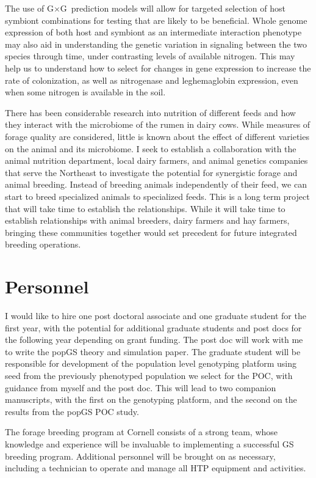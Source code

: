 \documentclass[10pt]{article}
\newcommand{\gxg}{G$\times$G}
\begin{document}
The use of \gxg\ prediction models will allow for targeted selection of host symbiont combinations for testing that are likely to be beneficial. Whole genome expression of both host and symbiont as an intermediate interaction phenotype may also aid in understanding the genetic variation in signaling between the two species through time, under contrasting levels of available nitrogen. This may help us to understand how to select for changes in gene expression to increase the rate of colonization, as well as nitrogenase and leghemaglobin expression, even when some nitrogen is available in the soil. 


There has been considerable research into nutrition of different feeds and how they interact with the microbiome of the rumen in dairy cows. While measures of forage quality are considered, little is known about the effect of different varieties on the animal and its microbiome. I seek to establish a collaboration with the animal nutrition department, local dairy farmers, and animal genetics companies that serve the Northeast to investigate the potential for synergistic forage and animal breeding. Instead of breeding animals independently of their feed, we can start to breed specialized animals to specialized feeds. This is a long term project that will take time to establish the relationships.  While it will take time to establish relationships with animal breeders, dairy farmers and hay farmers, bringing these communities together would set precedent for future integrated breeding operations.

\section*{Personnel}

I would like to hire one post doctoral associate and one graduate student for the first year, with the potential for additional graduate students and post docs for the following year depending on grant funding. The post doc will work with me to write the popGS theory and simulation paper. The graduate student will be responsible for development of the population level genotyping platform using seed from the previously phenotyped population we select for the POC, with guidance from myself and the post doc. This will lead to two companion manuscripts, with the first on the genotyping platform, and the second on the results from the popGS POC study. 

The forage breeding program at Cornell consists of a strong team, whose knowledge and experience will be invaluable to implementing a successful GS breeding program. Additional personnel will be brought on as necessary, including a technician to operate and manage all HTP equipment and activities.
\end{document}
